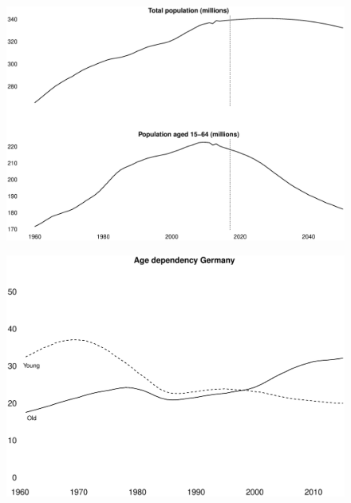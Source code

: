 \documentclass{beamer}
\begin{document}
\begin{frame}
  \begin{figure}
    \includegraphics[scale=.3]{population_projection.eps}
  \end{figure}
\end{frame}

\begin{frame}
  \begin{figure}
    \includegraphics[scale=.3]{age_ger.eps}
  \end{figure}
\end{frame}
\end{document}
